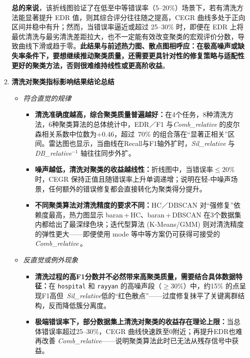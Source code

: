\documentclass[10pt]{article} %
\numberwithin{equation}{section}
\begin{document}
\begin{enumerate}[label=(\alph*)]
\noindent
\textbf{总的来说}，该折线图验证了在低至中等错误率（5--20\%）场景下，若有清洗方法能显著提升 EDR 值，则其综合评分往往随之提高，CEGR 曲线多处于正向区间并稳中有升；然而，当错误率逼近或超过 25--30\% 时，即便在 EDR 上将最优清洗与最劣清洗差距拉大，也不一定能有效改变聚类的宏观评价分数，导致曲线下滑或趋于零。\textbf{此结果与前述热力图、散点图相呼应：在极高噪声或缺失率条件下，要想继续推动聚类质量，还需要更具针对性的修复策略与适配性更好的聚类方法，否则很难维持线性或更高阶收益}。  
    \item \textbf{清洗对聚类指标影响结果结论总结}\\[-0.4em]
\begin{itemize}
    \item \emph{符合直觉的规律}\\[-0.2em]
    \begin{itemize}
        \item \textbf{清洗准确度越高，综合聚类质量普遍越好：}在4个任务，8种清洗方法，6种聚类算法的总体统计中，EDR／F1 与\textit{Comb\_relative} 的皮尔森相关系数中位数为$+0.46$，超过 70\% 的组合落在“显著正相关”区间。雷达图也显示，当曲线在Recall与F1轴外扩时，\textit{Sil\_relative} 与 \textit{DB\_relative}$^{-1}$ 轴往往同步外扩。  
        \item \textbf{噪声越低，清洗对聚类的收益越线性：}折线图中，当错误率$\le20\%$ 时，CEGR 保持正值且随错误率上升单调递增；说明在轻‑中噪声场景，任何额外的错误修复都会直接转化为聚类得分提升。  
        \item \textbf{不同聚类算法对清洗精度的要求不同：}HC／DBSCAN 对“强修复”依赖度最高，热力图显示 baran\,+\,HC、baran\,+\,DBSCAN 在3个数据集内都给出了最深绿色块；迭代型算法 (K‑Means/GMM) 则对清洗精度的弹性更大——即便使用 mode 等中等方案仍可获得可接受的 \textit{Comb\_relative}\,。  
    \end{itemize}

    \vspace{0.2em}
    \item \emph{反直觉或例外现象}\\[-0.2em]
    \begin{itemize}
        \item \textbf{清洗过程的高F1分数并不必然带来高聚类质量，需要结合具体数据特征：}在 \texttt{hospital} 和 \texttt{rayyan} 的高噪声段（$\ge30\%$）中，约15\% 的点呈现F1高但 \textit{Sil\_relative}低的“红色散点”——过度修复抹平了关键离群结构，反而降低簇分离度。  
        \item \textbf{极端错误率下，部分数据集上清洗对聚类的收益存在理论上限：}当总体错误率超过25–30\%，CEGR 曲线快速跌至0附近；再提升EDR也难再改善 \textit{Comb\_relative}——说明聚类算法此时已无法从残存信号中获益。   
    \end{itemize}
\end{itemize}
\end{enumerate}
\end{document}
